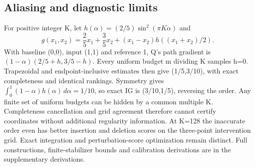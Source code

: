 \subsection{Aliasing and diagnostic limits}

For positive integer K, let $h(\alpha)=(2/5)\sin^2(\pi K\alpha)$ and
\begin{equation}
 g(x_1,x_2)=\frac25x_1+\frac35x_2+(x_1-x_2)h((x_1+x_2)/2).
\label{eq:alias}
\end{equation}
With baseline (0,0), input (1,1) and reference 1, Q's path gradient is $(1-\alpha)(2/5+h,3/5-h)$. Every uniform budget m dividing K samples h=0. Trapezoidal and endpoint-inclusive estimates then give (1/5,3/10), with exact completeness and identical rankings. Symmetry gives $\int_0^1(1-\alpha)h(\alpha)\,d\alpha=1/10$, so exact IG is (3/10,1/5), reversing the order. Any finite set of uniform budgets can be hidden by a common multiple K. Completeness cancellation and grid agreement therefore cannot certify coordinates without additional regularity information. At K=128 the inaccurate order even has better insertion and deletion scores on the three-point intervention grid. Exact integration and perturbation-score optimization remain distinct. Full constructions, finite-stabilizer bounds and calibration derivations are in the supplementary derivations.
